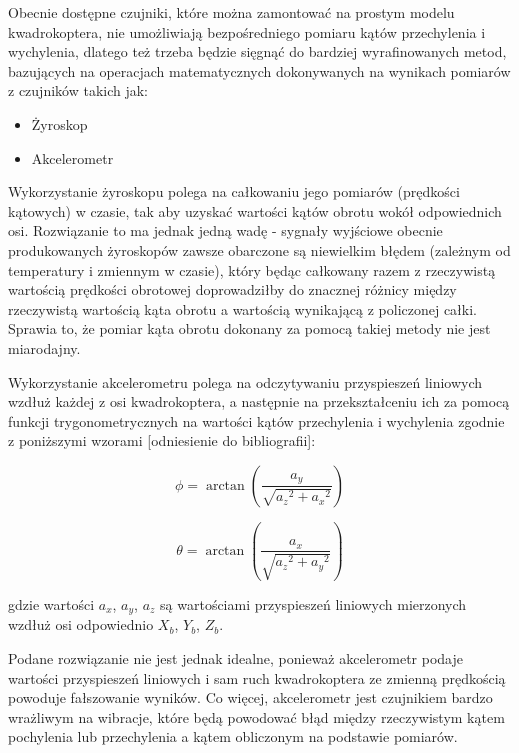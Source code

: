 Obecnie dostępne czujniki, które można zamontować na prostym modelu kwadrokoptera, nie umożliwiają bezpośredniego pomiaru kątów przechylenia i wychylenia, dlatego też trzeba będzie sięgnąć do bardziej wyrafinowanych metod, bazujących na operacjach matematycznych dokonywanych na wynikach pomiarów z czujników takich jak:

\begin{itemize}
	\item Żyroskop
	\item Akcelerometr
\end{itemize} 

Wykorzystanie żyroskopu polega na całkowaniu jego pomiarów (prędkości kątowych) w czasie, tak aby uzyskać wartości kątów obrotu wokół odpowiednich osi. Rozwiązanie to ma jednak jedną wadę - sygnały wyjściowe obecnie produkowanych  żyroskopów zawsze obarczone są niewielkim błędem (zależnym od temperatury i zmiennym w czasie), który będąc całkowany razem z rzeczywistą wartością prędkości obrotowej doprowadziłby do znacznej różnicy między rzeczywistą wartością kąta obrotu a wartością wynikającą z policzonej całki. Sprawia to, że pomiar kąta obrotu dokonany za pomocą takiej metody nie jest miarodajny.

Wykorzystanie akcelerometru polega na odczytywaniu przyspieszeń liniowych wzdłuż każdej z osi kwadrokoptera, a następnie na przekształceniu ich za pomocą funkcji trygonometrycznych na wartości kątów przechylenia i wychylenia zgodnie z poniższymi wzorami [odniesienie do bibliografii]:

\begin{equation}
	\phi = \arctan(\frac{a_y}{\sqrt{a{_z}^2 + a{_x}^2}})
\end{equation}

\begin{equation}
	\theta = \arctan(\frac{a_x}{\sqrt{a{_z}^2 + a{_y}^2}})
\end{equation}

gdzie wartości $a_x$, $a_y$, $a_z$ są wartościami przyspieszeń liniowych mierzonych wzdłuż osi odpowiednio $X_b$, $Y_b$, $Z_b$.

Podane rozwiązanie nie jest jednak idealne, ponieważ akcelerometr podaje wartości przyspieszeń liniowych i sam ruch kwadrokoptera ze zmienną prędkością powoduje fałszowanie wyników. Co więcej, akcelerometr jest czujnikiem bardzo wrażliwym na wibracje, które będą powodować błąd między rzeczywistym kątem pochylenia lub przechylenia a kątem obliczonym na podstawie pomiarów.

